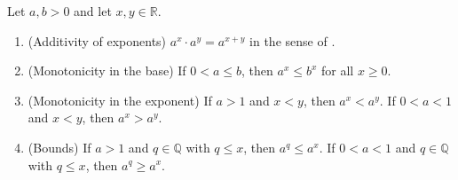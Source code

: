 \begin{theorem} \label{theorem:properties_of_real_exponentiation}
    Let $a,b > 0$ and let $x,y \in \mathbb{R}$.

    \begin{enumerate}
        \item (Additivity of exponents) $a^x \cdot a^y = a^{x+y}$ in the sense of .
        \item (Monotonicity in the base) If $0 < a \leq b$, then $a^x \leq b^x$ for all $x \geq 0$.
        \item (Monotonicity in the exponent) If $a > 1$ and $x < y$, then $a^x < a^y$. If $0 < a < 1$ and $x < y$, then $a^x > a^y$.
        \item (Bounds) If $a > 1$ and $q \in \mathbb{Q}$ with $q \leq x$, then $a^q \leq a^x$. If $0 < a < 1$ and $q \in \mathbb{Q}$ with $q \leq x$, then $a^q \geq a^x$.
    \end{enumerate}
\end{theorem}

